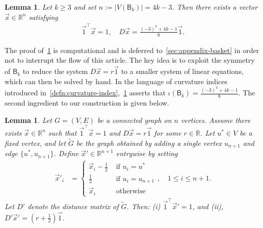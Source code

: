 \documentclass[11pt,a4paper]{article}
\newcommand{\distmatrix}{D}
\newcommand{\x}{\vec{x}}
\newcommand{\one}{\vec{1}}
\newcommand{\Basket}{\mathsf{B}}
\newtheorem{lemma}[theorem]{Lemma}
\begin{document}
    \begin{lemma}\label{lem:curvature-basket}
        Let $k\geq 3$ and set $n := |V(\Basket_k)| = 4k - 3$. Then there exists a vector $\x \in\mathbb{R}^{n}$ satisfying
            \begin{align}\label{eq:alpha-k}
                \one^\top\x  = 1, \quad \distmatrix\x  = \frac{(-3)^k+4k-1}{8} \one .
            \end{align}
    \end{lemma}

    The proof of~\cref{lem:curvature-basket} is computational and is deferred to~\cref{sec:appendix-basket} in order not to interrupt the flow of this article. The key idea is to exploit the symmetry of $\Basket_k$ to reduce the system $\distmatrix\x  = r \one $ to a smaller system of linear equations, which can then be solved by hand. In the language of curvature indices introduced in~\cref{defn:curvature-index},~\cref{lem:curvature-basket} asserts that $\iota(\Basket_k) =  \frac{(-3)^k+4k-1}{8}$. The second ingredient to our construction is given below.

    \begin{lemma}\label{lem:second-ingredient}
        Let $G=(V, E)$ be a connected graph on $n$ vertices. Assume there exists $\x \in\mathbb{R}^{n}$ such that $\one^\top \x  = 1$ and $\distmatrix\x  = r\one $ for some $r\in\mathbb{R}$. Let $u^\ast\in V$ be a fixed vertex, and let $\widetilde{G}$ be the graph obtained by adding a single vertex $u_{n+1}$ and edge $\{u^\ast, u_{n+1}\}$. Define $\x'\in\mathbb{R}^{n+1}$ entrywise by setting
            \begin{align*}
                \x'_i &=\begin{cases}
                    \x_i - \frac{1}{2} &\text{ if }u_i = u^\ast\\
                    \frac{1}{2} &\text{ if }u_i = u_{n+1}\\
                    \x_i&\text{ otherwise}
                \end{cases},\quad  1\leq i \leq n+1.
            \end{align*}
        Let $\distmatrix'$ denote the distance matrix of $\widetilde{G}$. Then: \emph{(i)} $\one^\top\x' = 1$, and \emph{(ii)}, $\distmatrix'\x'  = (r + \frac{1}{2}) \one $.
    \end{lemma}
\end{document}
